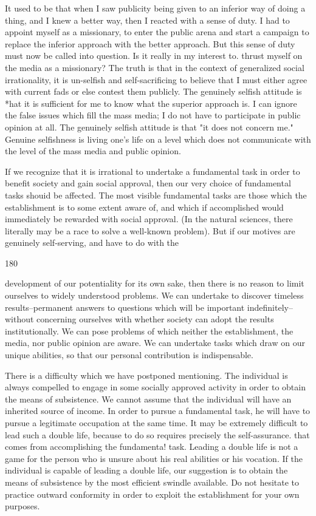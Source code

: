 \documentclass[10pt,twoside]{memoir}
\begin{document}
\begin{enumerate}
{{It used to be that when I saw publicity being given to an inferior way of 
doing a thing, and I knew a better way, then I reacted with a sense of duty. I 
had to appoint myself as a missionary, to enter the public arena and start a 
campaign to replace the inferior approach with the better approach. But this 
sense of duty must now be called into question. Is it really in my interest to. 
thrust myself on the media as a missionary? The truth is that in the context 
of generalized social irrationality, it is un-selfish and self-sacrificing to believe 
that I must either agree with current fads or else contest them publicly. The 
genuinely selfish attitude is *hat it is sufficient for me to know what the 
superior approach is. I can ignore the false issues which fill the mass media; I 
do not have to participate in public opinion at all. The genuinely selfish 
attitude is that "it does not concern me." Genuine selfishness is living one's 
life on a level which does not communicate with the level of the mass media 
and public opinion. 

If we recognize that it is irrational to undertake a fundamental task in 
order to benefit society and gain social approval, then our very choice of 
fundamental tasks shouid be affected. The most visible fundamental tasks 
are those which the establishment is to some extent aware of, and which if 
accomplished would immediately be rewarded with social approval. (In the 
natural sciences, there literally may be a race to solve a well-known problem). 
But if our motives are genuinely self-serving, and have to do with the 


180 


development of our potentiality for its own sake, then there is no reason to 
limit ourselves to widely understood problems. We can undertake to discover 
timeless results--permanent answers to questions which will be important 
indefinitely--without concerning ourselves with whether society can adopt 
the results institutionally. We can pose problems of which neither the 
establishment, the media, nor public opinion are aware. We can undertake 
tasks which draw on our unique abilities, so that our personal contribution is 
indispensable. 

There is a difficulty which we have postponed mentioning. The 
individual is always compelled to engage in some socially approved activity 
in order to obtain the means of subsistence. We cannot assume that the 
individual will have an inherited source of income. In order to pursue a 
fundamental task, he will have to pursue a legitimate occupation at the same 
time. It may be extremely difficult to lead such a double life, because to do 
so requires precisely the self-assurance. that comes from accomplishing the 
fundamenta! task. Leading a double life is not a game for the person who is 
unsure about his real abilities or his vocation. If the individual is capable of 
leading a double life, our suggestion is to obtain the means of subsistence by 
the most efficient swindle available. Do not hesitate to practice outward 
conformity in order to exploit the establishment for your own purposes. 

}}
\end{enumerate}
\end{document}
